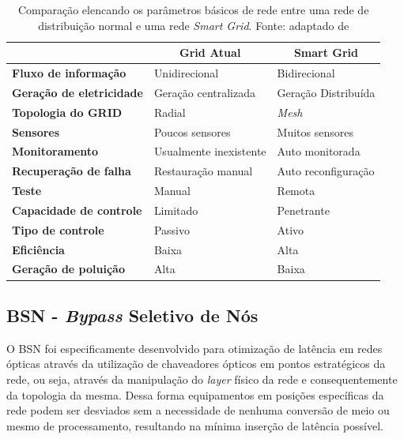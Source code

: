 \documentclass[conference]{IEEEtran}
\begin{document}
\begin{table}[tbp]
\begin{tabular}{l|l|l|}
\cline{2-3}
 & \multicolumn{1}{c|}{\textbf{Grid Atual}} & \multicolumn{1}{c|}{\textbf{Smart Grid}} \\ \hline
\multicolumn{1}{|l|}{\textbf{Fluxo de informação}} & Unidirecional & Bidirecional \\ \hline
\multicolumn{1}{|l|}{\textbf{Geração de eletricidade}} & Geração centralizada & Geração Distribuída \\ \hline
\multicolumn{1}{|l|}{\textbf{Topologia do GRID}} & Radial & \emph{Mesh} \\ \hline
\multicolumn{1}{|l|}{\textbf{Sensores}} & Poucos sensores & Muitos sensores \\ \hline
\multicolumn{1}{|l|}{\textbf{Monitoramento}} & Usualmente inexistente & Auto monitorada \\ \hline
\multicolumn{1}{|l|}{\textbf{Recuperação de falha}} & Restauração manual & Auto reconfiguração \\ \hline
\multicolumn{1}{|l|}{\textbf{Teste}} & Manual & Remota \\ \hline
\multicolumn{1}{|l|}{\textbf{Capacidade de controle}} & Limitado & Penetrante \\ \hline
\multicolumn{1}{|l|}{\textbf{Tipo de controle}} & Passivo & Ativo \\ \hline
\multicolumn{1}{|l|}{\textbf{Eficiência}} & Baixa & Alta \\ \hline
\multicolumn{1}{|l|}{\textbf{Geração de poluição}} & Alta & Baixa \\ \hline
\end{tabular}
\caption[Comparação entre GRIDS normal e \emph{Smart}]{Comparação elencando os parâmetros básicos de rede entre uma rede de distribuição normal e uma rede \emph{Smart Grid}. Fonte: adaptado de \cite{Art-Ma2013}}
\label{tab_comparacao_grids}
\end{table}
	
\subsection{BSN - \emph{Bypass} Seletivo de Nós}
O BSN foi especificamente desenvolvido para otimização de latência em redes ópticas através da utilização de chaveadores ópticos em pontos estratégicos da rede, ou seja, através da manipulação do \emph{layer} físico da rede e consequentemente da topologia da mesma. Dessa forma equipamentos em posições específicas da rede podem ser desviados sem a necessidade de nenhuma conversão de meio ou mesmo de processamento, resultando na mínima inserção de latência possível. 
\end{document}
